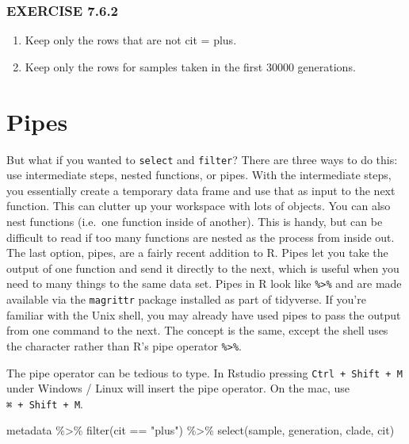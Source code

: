 \documentclass[
]{book}
\newenvironment{Shaded}{\begin{snugshade}}{\end{snugshade}}
\newcommand{\FunctionTok}[1]{\textcolor[rgb]{0.00,0.00,0.00}{#1}}
\newcommand{\NormalTok}[1]{#1}
\newcommand{\SpecialCharTok}[1]{\textcolor[rgb]{0.00,0.00,0.00}{#1}}
\newcommand{\StringTok}[1]{\textcolor[rgb]{0.31,0.60,0.02}{#1}}
\providecommand{\tightlist}{%
  \setlength{\itemsep}{0pt}\setlength{\parskip}{0pt}}
\begin{document}
\hypertarget{exercise-7.6.2}{%
\subsubsection*{EXERCISE 7.6.2}\label{exercise-7.6.2}}

\begin{enumerate}
\def\labelenumi{\arabic{enumi}.}
\tightlist
\item
  Keep only the rows that are not cit = plus.
\item
  Keep only the rows for samples taken in the first 30000 generations.
\end{enumerate}

\hypertarget{pipes}{%
\section{Pipes}\label{pipes}}

But what if you wanted to \texttt{select} and \texttt{filter}? There are three ways to do this: use intermediate steps, nested functions, or pipes. With the intermediate steps, you essentially create a temporary data frame and use that as input to the next function. This can clutter up your workspace with lots of objects. You can also nest functions (i.e.~one function inside of another). This is handy, but can be difficult to read if too many functions are nested as the process from inside out. The last option, pipes, are a fairly recent addition to R. Pipes let you take the output of one function and send it directly to the next, which is useful when you need to many things to the same data set. Pipes in R look like \texttt{\%\textgreater{}\%} and are made available via the \texttt{magrittr} package installed as part of tidyverse. If you're familiar with the Unix shell, you may already have used pipes to pass the output from one command to the next. The concept is the same, except the shell uses the \texttt{\textbar{}} character rather than R's pipe operator \texttt{\%\textgreater{}\%}.

The pipe operator can be tedious to type. In Rstudio pressing \texttt{Ctrl\ +\ Shift\ +\ M} under Windows / Linux will insert the pipe operator. On the mac, use \texttt{⌘\ +\ Shift\ +\ M}.

\begin{Shaded}
\begin{Highlighting}[]
\NormalTok{metadata }\SpecialCharTok{\%\textgreater{}\%}
  \FunctionTok{filter}\NormalTok{(cit }\SpecialCharTok{==} \StringTok{"plus"}\NormalTok{) }\SpecialCharTok{\%\textgreater{}\%}
  \FunctionTok{select}\NormalTok{(sample, generation, clade, cit)}
\end{Highlighting}
\end{Shaded}
\end{document}
